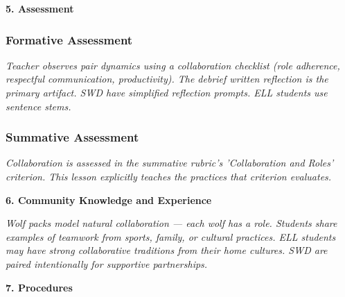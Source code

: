 \documentclass[11pt,letterpaper]{article}
\begin{document}
\newpage
\textbf{5. Assessment}

\subsubsection{Formative Assessment}

\textit{Teacher observes pair dynamics using a collaboration checklist (role adherence, respectful communication, productivity). The debrief written reflection is the primary artifact. SWD have simplified reflection prompts. ELL students use sentence stems.}

\subsubsection{Summative Assessment}

\textit{Collaboration is assessed in the summative rubric's 'Collaboration and Roles' criterion. This lesson explicitly teaches the practices that criterion evaluates.}

\textbf{6. Community Knowledge and Experience}

\textit{Wolf packs model natural collaboration --- each wolf has a role. Students share examples of teamwork from sports, family, or cultural practices. ELL students may have strong collaborative traditions from their home cultures. SWD are paired intentionally for supportive partnerships.}

\textbf{7. Procedures}
\end{document}
